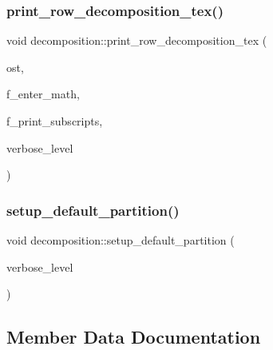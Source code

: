 \mbox{\label{classdecomposition_a6f9ffef0f905c9d52a941e3f8488e7de}} 
\subsubsection{\texorpdfstring{print\+\_\+row\+\_\+decomposition\+\_\+tex()}{print\_row\_decomposition\_tex()}}
{\footnotesize\ttfamily void decomposition\+::print\+\_\+row\+\_\+decomposition\+\_\+tex (\begin{DoxyParamCaption}\item[{ostream \&}]{ost,  }\item[{\mbox{\hyperlink{galois_8h_a09fddde158a3a20bd2dcadb609de11dc}{I\+NT}}}]{f\+\_\+enter\+\_\+math,  }\item[{\mbox{\hyperlink{galois_8h_a09fddde158a3a20bd2dcadb609de11dc}{I\+NT}}}]{f\+\_\+print\+\_\+subscripts,  }\item[{\mbox{\hyperlink{galois_8h_a09fddde158a3a20bd2dcadb609de11dc}{I\+NT}}}]{verbose\+\_\+level }\end{DoxyParamCaption})}

\mbox{\label{classdecomposition_a8589476ff85bb44acc19de00ffdf1b7f}} 
\subsubsection{\texorpdfstring{setup\+\_\+default\+\_\+partition()}{setup\_default\_partition()}}
{\footnotesize\ttfamily void decomposition\+::setup\+\_\+default\+\_\+partition (\begin{DoxyParamCaption}\item[{\mbox{\hyperlink{galois_8h_a09fddde158a3a20bd2dcadb609de11dc}{I\+NT}}}]{verbose\+\_\+level }\end{DoxyParamCaption})}



\subsection{Member Data Documentation}
\mbox{\label{classdecomposition_a6d3b1f5046696661a715f06efcfa0d4f}} 
